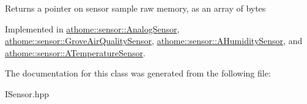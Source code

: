 Returns a pointer on sensor sample raw memory, as an array of bytes 

Implemented in \mbox{\hyperlink{classathome_1_1sensor_1_1_analog_sensor_ac45070688a9433256a5f847467c251fa}{athome\+::sensor\+::\+Analog\+Sensor}}, \mbox{\hyperlink{classathome_1_1sensor_1_1_grove_air_quality_sensor_aee12d8cf6439b752c868f75cae298182}{athome\+::sensor\+::\+Grove\+Air\+Quality\+Sensor}}, \mbox{\hyperlink{classathome_1_1sensor_1_1_a_humidity_sensor_a2eb6de3ce2a4aeae0d9e556389d2b329}{athome\+::sensor\+::\+A\+Humidity\+Sensor}}, and \mbox{\hyperlink{classathome_1_1sensor_1_1_a_temperature_sensor_a397794217f3163950add6d28f69a6202}{athome\+::sensor\+::\+A\+Temperature\+Sensor}}.



The documentation for this class was generated from the following file\+:\begin{DoxyCompactItemize}
\item 
I\+Sensor.\+hpp\end{DoxyCompactItemize}
